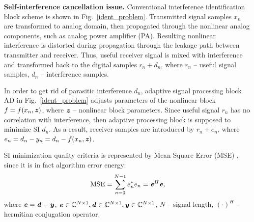\documentclass[12pt]{article}
\newcommand{\bit}[1]{\ensuremath{\textbf{\textit{#1}}}}
\begin{document}
\textbf{Self-interference cancellation issue.}
Conventional interference identification block scheme is shown in Fig.~\ref{ident_problem}. Transmitted signal samples $x_n$ are transformed to analog domain, then propagated through the nonlinear analog components, such as analog power amplifier (PA). Resulting nonlinear interference is distorted during propagation through the leakage path between transmitter and receiver. Thus, useful receiver signal is mixed with interference and transformed back to the digital samples $r_n+d_n$, where $r_n$ -- useful signal samples, $d_n$ -- interference samples. 

In order to get rid of parasitic interference $d_n$, adaptive signal processing block $\text{AD}$ in Fig.~\ref{ident_problem} adjusts parameters of the nonlinear block  $f = f(x_n, \bit{z})$, where \bit{z} -- nonlinear block parameters. Since useful signal $r_n$ has no correlation with interference, then adaptive processing block is supposed to minimize SI $d_n$. As a result, receiver samples are introduced by $r_n+e_n$, where $e_n=d_n-y_n=d_n-f(x_n, \bit{z})$.

SI minimization quality criteria is represented by Mean Square Error (MSE) \cite{behav_model}, since it is in fact algorithm error energy:
\begin{equation}
    \displaystyle\text{MSE}=\sum_{n=0}^{N-1}e_n^*e_n=\bit{e}^H\bit{e},
    \label{mse}
\end{equation}
where $\bit{e}=\bit{d}-\bit{y}$, $\bit{e}\in\mathbb{C}^{N\times 1}, \bit{d}\in\mathbb{C}^{N\times 1}, \bit{y}\in\mathbb{C}^{N\times 1}$, $N$ -- signal length, $(\cdot)^H$ -- hermitian conjugation operator.
\end{document}
